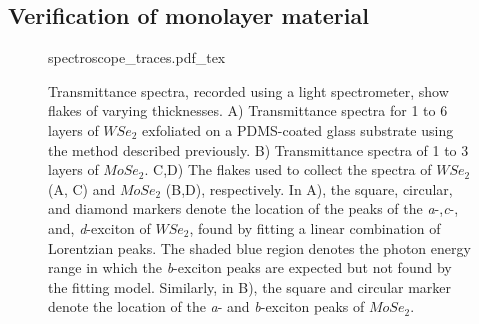 \subsection{Verification of monolayer material}
\begin{figure}[h]
	\centering
	\def\svgwidth{1\linewidth}
	{spectroscope_traces.pdf_tex}
	\caption{Transmittance spectra, recorded using a light spectrometer, show flakes of varying thicknesses. A) Transmittance spectra for 1 to 6 layers of $WSe_2$ exfoliated on a PDMS-coated glass substrate using the method described previously. 
    B) Transmittance spectra of 1 to 3 layers of $MoSe_2$.
    C,D) The flakes used to collect the spectra of $WSe_2$ (A, C) and $MoSe_2$ (B,D), respectively.
    In A), the square, circular, and diamond markers denote the location of the peaks of the \textit{a}-,\textit{c}-, and, \textit{d}-exciton of $WSe_2$, found by fitting a linear combination of Lorentzian peaks. The shaded blue region denotes the photon energy range in which the \textit{b}-exciton peaks are expected but not found by the fitting model.
    Similarly, in B), the square and circular marker denote the location of the \textit{a}- and \textit{b}-exciton peaks of $MoSe_2$.}
	\label{fig:spectroscope_traces}
\end{figure}

